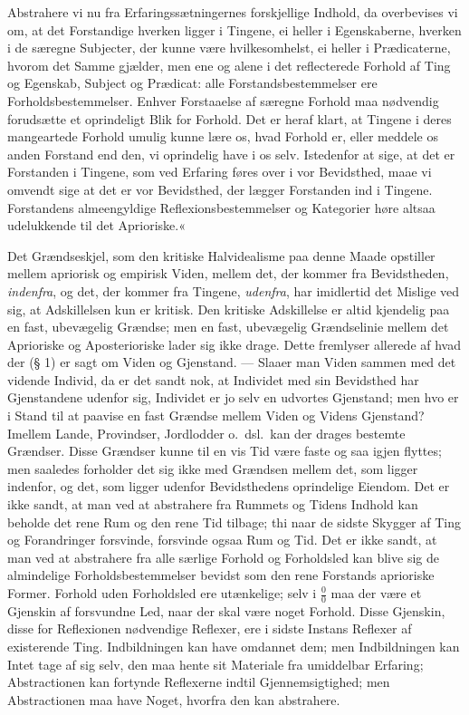 \documentclass[12pt]{book}
\newcommand{\apage}[1]{\marginnote{\footnotesize\textit{[#1]}}}
\begin{document}
Abstrahere vi nu fra Erfaringssætningernes forskjellige Indhold, da
overbevises vi om, at det Forstandige hverken ligger i Tingene, ei heller
i Egenskaberne, hverken i de særegne Subjecter, der kunne være
hvilkesomhelst, ei heller i Prædicaterne, hvorom det Samme gjælder, men
ene og alene i det reflecterede Forhold af Ting og Egenskab, Subject og
Prædicat: alle Forstandsbestemmelser ere Forholdsbestemmelser. Enhver
Forstaaelse af særegne Forhold maa nødvendig forudsætte et oprindeligt
Blik for Forhold. Det er heraf klart, at Tingene i deres mangeartede
Forhold umulig kunne lære os, hvad Forhold er, eller meddele os anden
Forstand end den, vi oprindelig have i os selv. Istedenfor at sige, at det
er Forstanden i Tingene, som ved Erfaring føres over i vor Bevidsthed,
maae vi omvendt sige at det er vor Bevidsthed, der lægger Forstanden ind i
Tingene. Forstandens almeengyldige  \apage{37} Reflexionsbestemmelser og Kategorier
høre altsaa udelukkende til det Aprioriske.«

Det Grændseskjel, som den kritiske Halvidealisme paa denne Maade opstiller
mellem apriorisk og empirisk Viden, mellem det, der kommer fra
Bevidstheden, \emph{indenfra}, og det, der kommer fra Tingene, \emph{udenfra}, har
imidlertid det Mislige ved sig, at Adskillelsen kun er kritisk. Den
kritiske Adskillelse er altid kjendelig paa en fast, ubevægelig Grændse;
men en fast, ubevægelig Grændselinie mellem det Aprioriske og
Aposterioriske lader sig ikke drage. Dette fremlyser allerede af hvad der
(§ 1) er sagt om Viden og Gjenstand. --- Slaaer man Viden sammen med det
vidende Individ, da er det sandt nok, at Individet med sin Bevidsthed har
Gjenstandene udenfor sig, Individet er jo selv en udvortes Gjenstand; men
hvo er i Stand til at paavise en fast Grændse mellem Viden og Videns
Gjenstand? Imellem Lande, Provindser, Jordlodder o.\ dsl.\ kan der drages
bestemte Grændser. Disse Grændser kunne til en vis Tid være faste og saa
igjen flyttes; men saaledes forholder det sig ikke med Grændsen mellem
det, som ligger indenfor, og det, som ligger udenfor Bevidsthedens
oprindelige Eiendom. Det er ikke sandt, at man ved at abstrahere fra
Rummets og Tidens Indhold kan beholde det rene Rum og den rene Tid
tilbage; thi naar de sidste Skygger af Ting og Forandringer forsvinde,
forsvinde ogsaa Rum og Tid. Det er ikke sandt, at man ved at abstrahere
fra alle særlige Forhold og Forholdsled kan blive sig de almindelige
Forholdsbestemmelser bevidst  \apage{38} som den rene Forstands aprioriske Former.
Forhold uden Forholdsled ere utænkelige; selv i $\frac{0}{0}$ maa der være
et Gjenskin af forsvundne Led, naar der skal være noget Forhold. Disse
Gjenskin, disse for Reflexionen nødvendige Reflexer, ere i sidste Instans
Reflexer af existerende Ting. Indbildningen kan have omdannet dem; men
Indbildningen kan Intet tage af sig selv, den maa hente sit Materiale fra
umiddelbar Erfaring; Abstractionen kan fortynde Reflexerne indtil
Gjennemsigtighed; men Abstractionen maa have Noget, hvorfra den kan
abstrahere.
\end{document}
